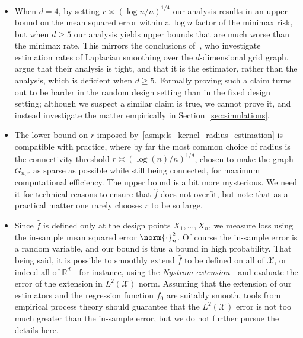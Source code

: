 \documentclass[twoside]{article}
\newcommand{\Reals}{\mathbb{R}}
\newcommand{\1}{\mathbf{1}}
\newcommand{\Xset}{\mathcal{X}}
\newcommand{\Leb}{L}
\newcommand{\wh}[1]{\widehat{#1}}
\theoremstyle{definition}
\theoremstyle{remark}
\begin{document}
\begin{itemize}
	\item When $d = 4$, by setting $r \asymp (\log n/n)^{1/4}$ our analysis results in an upper bound on the mean squared error within a $\log n$ factor of the minimax risk, but when $d \geq 5$ our analysis yields upper bounds that are much worse than the minimax rate. This mirrors the conclusions of~\cite{sadhanala16}, who investigate estimation rates of Laplacian smoothing over the $d$-dimensional grid graph. \cite{sadhanala16} argue that their analysis is tight, and that it is the estimator, rather than the analysis, which is deficient when $d \geq 5$. Formally proving such a claim turns out to be harder in the random design setting than in the fixed design setting; although we suspect a similar claim is true, we cannot prove it, and instead investigate the matter empirically in Section~\ref{sec:simulations}.
	\item The lower bound on $r$ imposed by~\ref{asmp:ls_kernel_radius_estimation} is  compatible with practice, where by far the most common choice of radius is the connectivity threshold $r \asymp (\log(n)/n)^{1/d}$, chosen to make the graph $G_{n,r}$ as sparse as possible while still being connected, for maximum computational efficiency. The upper bound is a bit more mysterious. We need it for technical reasons to ensure that $\wh{f}$ does not overfit, but note that as a practical matter one rarely chooses $r$ to be so large.
	\item Since $\wh{f}$ is defined only at the design points $X_1,\ldots,X_n$, we measure loss using the in-sample mean squared error $\norm{\cdot}_n^2$. Of course the in-sample error is a random variable, and our bound is thus a bound in high probability. That being said, it is possible to smoothly extend $\wh{f}$ to be defined on all of $\Xset$, or indeed all of $\Reals^d$---for instance, using the \emph{Nystrom extension}---and evaluate the error of the extension in $\Leb^2(\Xset)$ norm. Assuming that the extension of our estimators and the regression function $f_0$ are suitably smooth, tools from empirical process theory should guarantee that the $\Leb^2(\Xset)$ error is not too much greater than the in-sample error, but we do not further pursue the details here.
\end{itemize}
\end{document}

